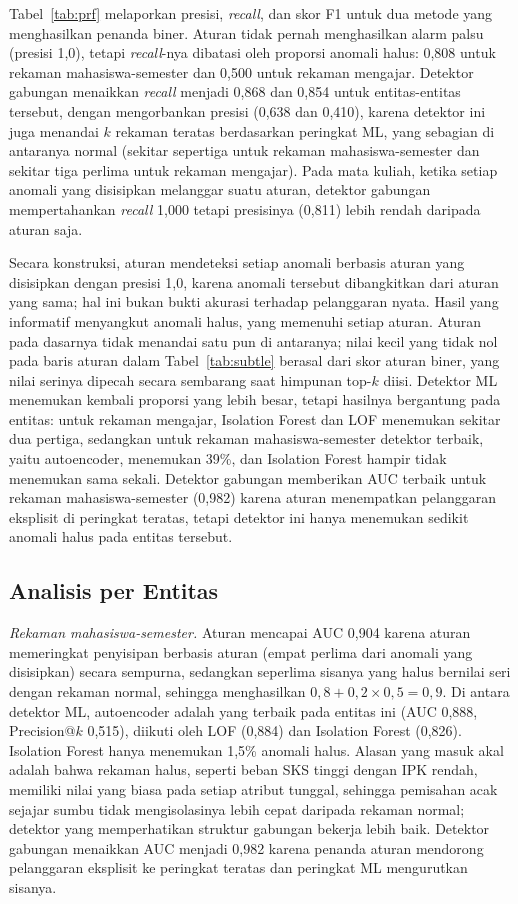 \documentclass[conference]{IEEEtran}
\begin{document}
Tabel~\ref{tab:prf} melaporkan presisi, \textit{recall}, dan skor F1 untuk dua metode yang menghasilkan penanda biner. Aturan tidak pernah menghasilkan alarm palsu (presisi 1,0), tetapi \textit{recall}-nya dibatasi oleh proporsi anomali halus: 0,808 untuk rekaman mahasiswa-semester dan 0,500 untuk rekaman mengajar. Detektor gabungan menaikkan \textit{recall} menjadi 0,868 dan 0,854 untuk entitas-entitas tersebut, dengan mengorbankan presisi (0,638 dan 0,410), karena detektor ini juga menandai $k$ rekaman teratas berdasarkan peringkat ML, yang sebagian di antaranya normal (sekitar sepertiga untuk rekaman mahasiswa-semester dan sekitar tiga perlima untuk rekaman mengajar). Pada mata kuliah, ketika setiap anomali yang disisipkan melanggar suatu aturan, detektor gabungan mempertahankan \textit{recall} 1,000 tetapi presisinya (0,811) lebih rendah daripada aturan saja.

Secara konstruksi, aturan mendeteksi setiap anomali berbasis aturan yang disisipkan dengan presisi 1,0, karena anomali tersebut dibangkitkan dari aturan yang sama; hal ini bukan bukti akurasi terhadap pelanggaran nyata. Hasil yang informatif menyangkut anomali halus, yang memenuhi setiap aturan. Aturan pada dasarnya tidak menandai satu pun di antaranya; nilai kecil yang tidak nol pada baris aturan dalam Tabel~\ref{tab:subtle} berasal dari skor aturan biner, yang nilai serinya dipecah secara sembarang saat himpunan top-$k$ diisi. Detektor ML menemukan kembali proporsi yang lebih besar, tetapi hasilnya bergantung pada entitas: untuk rekaman mengajar, Isolation Forest dan LOF menemukan sekitar dua pertiga, sedangkan untuk rekaman mahasiswa-semester detektor terbaik, yaitu autoencoder, menemukan 39\%, dan Isolation Forest hampir tidak menemukan sama sekali. Detektor gabungan memberikan AUC terbaik untuk rekaman mahasiswa-semester (0,982) karena aturan menempatkan pelanggaran eksplisit di peringkat teratas, tetapi detektor ini hanya menemukan sedikit anomali halus pada entitas tersebut.

\subsection{Analisis per Entitas}
{\raggedright \textit{Rekaman mahasiswa-semester.} Aturan mencapai AUC 0,904 karena aturan memeringkat penyisipan berbasis aturan (empat perlima dari anomali yang disisipkan) secara sempurna, sedangkan seperlima sisanya yang halus bernilai seri dengan rekaman normal, sehingga menghasilkan $0{,}8+0{,}2\times0{,}5=0{,}9$. Di antara detektor ML, autoencoder adalah yang terbaik pada entitas ini (AUC 0,888, Precision@$k$ 0,515), diikuti oleh LOF (0,884) dan Isolation Forest (0,826). Isolation Forest hanya menemukan 1,5\% anomali halus. Alasan yang masuk akal adalah bahwa rekaman halus, seperti beban SKS tinggi dengan IPK rendah, memiliki nilai yang biasa pada setiap atribut tunggal, sehingga pemisahan acak sejajar sumbu tidak mengisolasinya lebih cepat daripada rekaman normal; detektor yang memperhatikan struktur gabungan bekerja lebih baik. Detektor gabungan menaikkan AUC menjadi 0,982 karena penanda aturan mendorong pelanggaran eksplisit ke peringkat teratas dan peringkat ML mengurutkan sisanya.\par}
\end{document}
